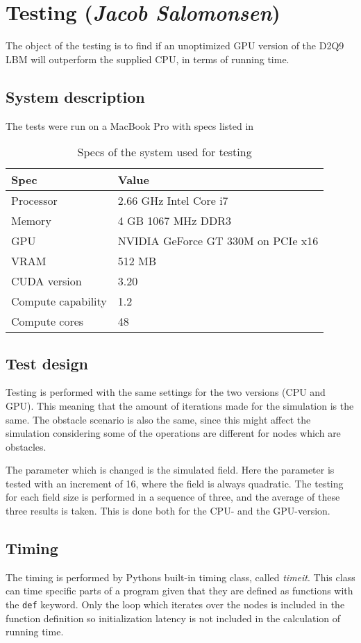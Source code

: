 \section{Testing (\textit{Jacob Salomonsen})}
The object of the testing is to find if an unoptimized GPU version of the D2Q9 LBM will outperform the supplied CPU, in terms of running time.

\subsection{System description}
The tests were run on a MacBook Pro with specs listed in 

\begin{table}[htb]
	\centering
	\begin{tabular}{ll}
		\toprule
		Spec & Value \\
		\midrule
		Processor & 2.66 GHz Intel Core i7 \\
		Memory & 4 GB 1067 MHz DDR3 \\
		GPU & NVIDIA GeForce GT 330M on PCIe x16\\
		VRAM & 512 MB\\
		CUDA version & 3.20\\
		Compute capability & 1.2\\
		Compute cores & 48\\		
		\bottomrule
	\end{tabular}
	\caption{Specs of the system used for testing}
	\label{specs}
\end{table}

\subsection{Test design}
Testing is performed with the same settings for the two versions (CPU and GPU). This meaning that the amount of iterations made for the simulation is the same. The obstacle scenario is also the same, since this might affect the simulation considering some of the operations are different for nodes which are obstacles. 

The parameter which is changed is the simulated field. Here the parameter is tested with an increment of 16, where the field is always quadratic. The testing for each field size is performed in a sequence of three, and the average of these three results is taken. This is done both for the CPU- and the GPU-version.

\subsection{Timing}
The timing is performed by Pythons built-in timing class, called \textit{timeit}. This class can time specific parts of a program given that they are defined as functions with the \texttt{def} keyword. Only the loop which iterates over the nodes is included in the function definition so initialization latency is not included in the calculation of running time.


